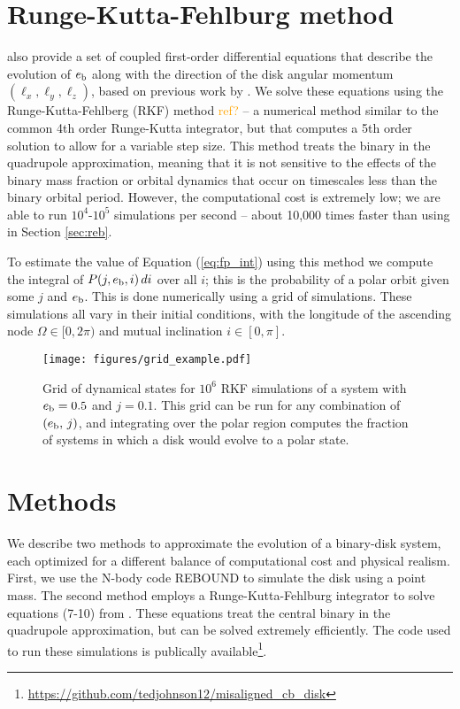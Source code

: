 \documentclass[twocolumn]{aastex631}
\newcommand\codeurl[0]{\url{https://github.com/tedjohnson12/misaligned_cb_disk}}
\newcommand{\TJ}[1]{\textcolor{orange}{#1}}
\begin{document}
\section{Runge-Kutta-Fehlburg method}
\label{sec:rk}
\citet[Equations (7-10)]{martin2019} also provide a set of coupled first-order differential equations that describe the evolution of $e_{\rm b}$ along with the direction of the disk angular momentum $(\ell_x, \ell_y, \ell_z)$, based on previous work by \citet{farago2010}. We solve these equations using the Runge-Kutta-Fehlberg (RKF) method \TJ{ref?} -- a numerical method similar to the common 4th order Runge-Kutta integrator, but that computes a 5th order solution to allow for a variable step size. This method treats the binary in the quadrupole approximation, meaning that it is not sensitive to the effects of the binary mass fraction or orbital dynamics that occur on timescales less than the binary orbital period. However, the computational cost is extremely low; we are able to run $10^4$-$10^5$ simulations per second -- about 10,000 times faster than using  in Section \ref{sec:reb}.

To estimate the value of Equation (\ref{eq:fp_int}) using this method we compute the integral of $P(j,e_{\rm b},i)\,di$ over all $i$; this is the probability of a polar orbit given some $j$ and $e_{\rm b}$. This is done numerically using a grid of simulations. These simulations all vary in their initial conditions, with the longitude of the ascending node $\Omega \in [0,2\pi)$ and mutual inclination $i \in [0,\pi]$.

\begin{figure}
    \begin{centering}
        \texttt{[image: figures/grid\_example.pdf]}
    \end{centering}
    \caption{
        Grid of dynamical states for $10^6$ RKF simulations of a system with $e_{\rm b}=0.5$ and $j=0.1$. This grid can be run for any combination of $(e_{\rm b},\,j)$, and integrating over the polar region computes the fraction of systems in which a disk would evolve to a polar state.
    }
    \label{fig:grid_example}
\end{figure}


\section{Methods}
\label{sec:methods}
We describe two methods to approximate the evolution of a binary-disk system, each optimized for a different balance of computational cost and physical realism.
First, we use the N-body code {\sc REBOUND} \citep{rebound} to simulate the disk using a point mass. The second method employs a Runge-Kutta-Fehlburg integrator to solve
equations (7-10) from \citet{martin2019}. These equations treat the central binary in the quadrupole approximation, but can be solved extremely efficiently.
The code used to run these simulations is publically available\footnote{\codeurl}.
\end{document}
